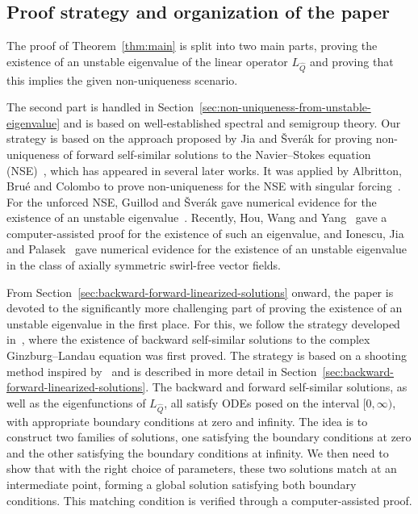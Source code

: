 \documentclass[11pt]{article}
\begin{document}
\subsection{Proof strategy and organization of the paper}
\label{sec:proof-strategy}

The proof of Theorem~\ref{thm:main} is split into two main parts,
proving the existence of an unstable eigenvalue of the linear operator
\(L_{\hat{Q}}\) and proving that this implies the given non-uniqueness
scenario.

The second part is handled in
Section~\ref{sec:non-uniqueness-from-unstable-eigenvalue} and is based
on well-established spectral and semigroup theory. Our strategy is
based on the approach proposed by Jia and Šverák for proving
non-uniqueness of forward self-similar solutions to the Navier--Stokes
equation (NSE)~\cite{Jia2015}, which has appeared in several later
works. It was applied by Albritton, Brué and Colombo to prove
non-uniqueness for the NSE with singular forcing~\cite{Albritton2022}.
For the unforced NSE, Guillod and Šverák gave numerical evidence for
the existence of an unstable eigenvalue~\cite{Guillod2023}. Recently,
Hou, Wang and Yang~\cite{Hou2025} gave a computer-assisted proof for
the existence of such an eigenvalue, and Ionescu, Jia and
Palasek~\cite{Ionescu2026} gave numerical evidence for the existence
of an unstable eigenvalue in the class of axially symmetric swirl-free
vector fields.

From Section~\ref{sec:backward-forward-linearized-solutions} onward,
the paper is devoted to the significantly more challenging part of
proving the existence of an unstable eigenvalue in the first place.
For this, we follow the strategy developed in~\cite{Dahne2024}, where
the existence of backward self-similar solutions to the complex
Ginzburg--Landau equation was first proved. The strategy is based on
a shooting method
inspired by~\cite{Plech2001} and is described in more detail in
Section~\ref{sec:backward-forward-linearized-solutions}. The backward
and forward self-similar solutions, as well as the eigenfunctions of
\(L_{\hat{Q}}\), all satisfy ODEs posed on the interval
\([0, \infty)\), with appropriate boundary conditions at zero and
infinity. The idea is to construct two families of solutions, one
satisfying the boundary conditions at zero and the other satisfying
the boundary conditions at infinity. We then need to show that with
the right choice of parameters, these two solutions match at an
intermediate point, forming a global solution satisfying both boundary
conditions. This matching condition is verified through a
computer-assisted proof.
\end{document}
